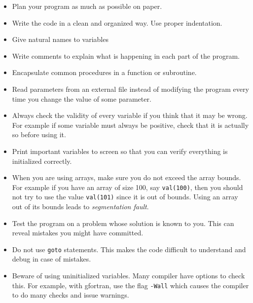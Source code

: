 \documentclass[11pt,oneside]{amsart}
\begin{document}
\begin{itemize}

\item Plan your program as much as possible on paper.

\item Write the code in a clean and organized way. Use proper indentation.

\item Give natural names to variables

\item Write comments to explain what is happening in each part of the program.

\item Encapsulate common procedures in a function or subroutine.

\item Read parameters from an external file instead of modifying the program every time you change the value of some parameter.

\item Always check the validity of every variable if you think that it may be wrong. For example if some variable must always be positive, check that it is actually so before using it.

\item Print important variables to screen so that you can verify everything is initialized correctly.

\item When you are using arrays, make sure you do not exceed the array bounds. For example if you have an array of size 100, say {\tt val(100)}, then you should not try to use the value {\tt val(101)} since it is out of bounds. Using an array out of its bounds leads to {\em segmentation fault}.

\item Test the program on a problem whose solution is known to you. This can reveal mistakes you might have committed.

\item Do not use {\tt goto} statements. This makes the code difficult to understand and debug in case of mistakes.

\item Beware of using uninitialized variables. Many compiler have options to check this. For example, with gfortran, use the flag {\tt -Wall} which causes the compiler to do many checks and issue warnings.

\end{itemize}
\end{document}
